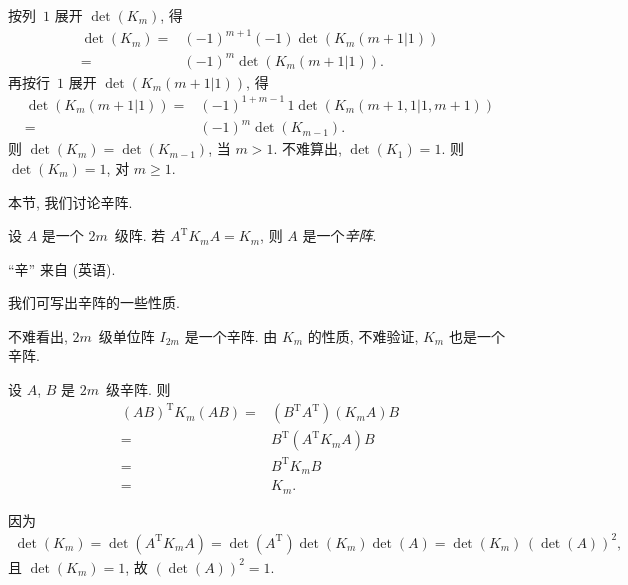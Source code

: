 \documentclass[../libro.tex]{subfiles}
\begin{document}
按列~\(1\) 展开 \(\det {(K_m)}\), 得
\begin{align*}
    \det {(K_m)}
    = {} &
    (-1)^{m+1} (-1) \det {(K_m ({m+1}|1))}
    \\
    = {} &
    (-1)^{m} \det {(K_m ({m+1}|1))}.
\end{align*}
再按行~\(1\) 展开 \(\det {(K_m ({m+1}|1))}\), 得
\begin{align*}
    \det {(K_m ({m+1}|1))}
    = {} &
    (-1)^{1+m-1}\, 1 \det {(K_m ({m+1,1}|{1,m+1}))}
    \\
    = {} &
    (-1)^m \det {(K_{m-1})}.
\end{align*}
则 \(\det {(K_m)} = \det {(K_{m-1})}\),
当 \(m > 1\).
不难算出, \(\det {(K_1)} = 1\).
则 \(\det {(K_m)} = 1\), 对 \(m \geq 1\).

本节, 我们讨论辛阵.

\begin{definition}
    设 \(A\) 是一个 \(2m\)~级阵.
    若 \(A^{\mathrm{T}} K_m A = K_m\),
    则 \(A\) 是一个\emph{辛阵}.
\end{definition}

``辛'' 来自  (英语).

我们可写出辛阵的一些性质.

不难看出, \(2m\)~级单位阵 \(I_{2m}\) 是一个辛阵.
由 \(K_m\) 的性质, 不难验证,
\(K_m\) 也是一个辛阵.

设 \(A\), \(B\) 是 \(2m\)~级辛阵.
则
\begin{align*}
    (AB)^{\mathrm{T}} K_m (AB)
    = {} &
    (B^{\mathrm{T}} A^{\mathrm{T}})
    (K_m A) B
    \\
    = {} &
    B^{\mathrm{T}}
    (A^{\mathrm{T}} K_m A)
    B
    \\
    = {} &
    B^{\mathrm{T}} K_m B
    \\
    = {} &
    K_m.
\end{align*}

因为
\begin{align*}
    \det {(K_m)}
    = \det {(A^{\mathrm{T}} K_m A)}
    = \det {(A^{\mathrm{T}})} \det {(K_m)} \det {(A)}
    = \det {(K_m)}\, (\det {(A)})^2,
\end{align*}
且 \(\det {(K_m)} = 1\),
故 \((\det {(A)})^2 = 1\).
\end{document}
